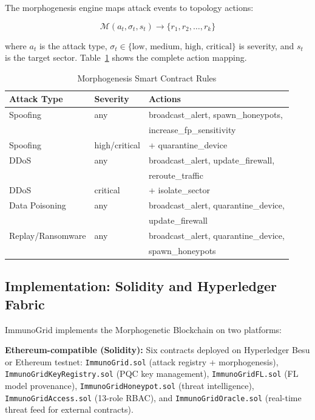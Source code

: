 The morphogenesis engine maps attack events to topology actions:

\begin{equation}
\mathcal{M}(a_t, \sigma_t, s_t) \rightarrow \{r_1, r_2, \ldots, r_k\}
\label{eq:morphogenesis}
\end{equation}

where $a_t$ is the attack type, $\sigma_t \in \{\text{low, medium, high, critical}\}$
is severity, and $s_t$ is the target sector. Table~\ref{tab:morphogenesis_rules}
shows the complete action mapping.

\begin{table}[h]
\caption{Morphogenesis Smart Contract Rules}
\label{tab:morphogenesis_rules}
\centering
\small
\begin{tabular}{lll}
\toprule
\textbf{Attack Type} & \textbf{Severity} & \textbf{Actions} \\
\midrule
Spoofing & any & broadcast\_alert, spawn\_honeypots, \\
         &     & increase\_fp\_sensitivity \\
Spoofing & high/critical & + quarantine\_device \\
DDoS     & any & broadcast\_alert, update\_firewall, \\
         &     & reroute\_traffic \\
DDoS     & critical & + isolate\_sector \\
Data Poisoning & any & broadcast\_alert, quarantine\_device, \\
               &     & update\_firewall \\
Replay/Ransomware & any & broadcast\_alert, quarantine\_device, \\
                  &     & spawn\_honeypots \\
\bottomrule
\end{tabular}
\end{table}

\subsection{Implementation: Solidity and Hyperledger Fabric}

ImmunoGrid implements the Morphogenetic Blockchain on two platforms:

\textbf{Ethereum-compatible (Solidity):} Six contracts deployed on Hyperledger
Besu or Ethereum testnet: \texttt{ImmunoGrid.sol} (attack registry + morphogenesis),
\texttt{ImmunoGridKeyRegistry.sol} (PQC key management), \texttt{ImmunoGridFL.sol}
(FL model provenance), \texttt{ImmunoGridHoneypot.sol} (threat intelligence),
\texttt{ImmunoGridAccess.sol} (13-role RBAC), and \texttt{ImmunoGridOracle.sol}
(real-time threat feed for external contracts).

